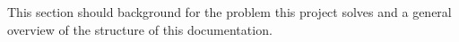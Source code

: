 This section should background for the problem this project solves and a general overview of the structure of this documentation.